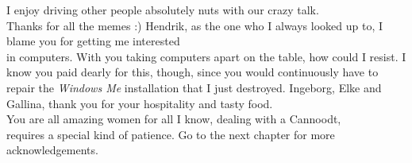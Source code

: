 I enjoy driving other people absolutely nuts with our crazy talk.\\Thanks for all the memes :)
Hendrik, as the one who I always looked up to, I blame you for getting me interested\\in computers. With you taking computers apart on the table, how could I resist.
I know you paid dearly for this, though, since you would continuously have to\\repair the \textit{Windows Me} installation that I just destroyed.
Ingeborg, Elke and Gallina, thank you for your hospitality and tasty food.\\You are all amazing women
for all I know, dealing with a Cannoodt,\\requires a special kind of patience.
Go to the next chapter for more acknowledgements.







